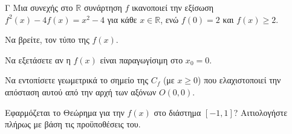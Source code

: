 \begin{thema}{Γ}
Μια συνεχής στο $\mathbb{R}$ συνάρτηση $f$ ικανοποιεί την εξίσωση $f^2(x) - 4f(x) = x^2 - 4$ για κάθε $x\in\mathbb{R}$, ενώ $f(0)=2$ και $f(x) \ge 2$.
\begin{erwthma}
  \item Να βρείτε, τον τύπο της $f(x)$.
  \item Να εξετάσετε αν η $f(x)$ είναι παραγωγίσιμη στο $x_0=0$.
  \item Να εντοπίσετε γεωμετρικά το σημείο της $C_f$ (με $x \ge 0$) που ελαχιστοποιεί την απόσταση αυτού από την αρχή των αξόνων $O(0,0)$.
  \item Εφαρμόζεται το Θεώρημα  για την $f(x)$ στο διάστημα $[-1, 1]$? Αιτιολογήστε πλήρως με βάση τις προϋποθέσεις του. 
\end{erwthma}
\end{thema}
